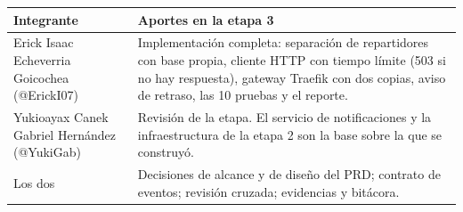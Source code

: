 \documentclass[11pt]{article}
\begin{document}
\begin{tabularx}{\linewidth}{@{}p{4.2cm} X@{}}
\toprule
\textsf{\textbf{Integrante}} & \textsf{\textbf{Aportes en la etapa 3}} \\
\midrule
Erick Isaac Echeverria Goicochea (@ErickI07) & Implementación completa: separación de repartidores con base propia, cliente HTTP con tiempo límite (503 si no hay respuesta), gateway Traefik con dos copias, aviso de retraso, las 10 pruebas y el reporte. \\
Yukioayax Canek Gabriel Hernández (@YukiGab) & Revisión de la etapa. El servicio de notificaciones y la infraestructura de la etapa 2 son la base sobre la que se construyó. \\
Los dos & Decisiones de alcance y de diseño del PRD; contrato de eventos; revisión cruzada; evidencias y bitácora. \\
\bottomrule
\end{tabularx}
\end{document}
